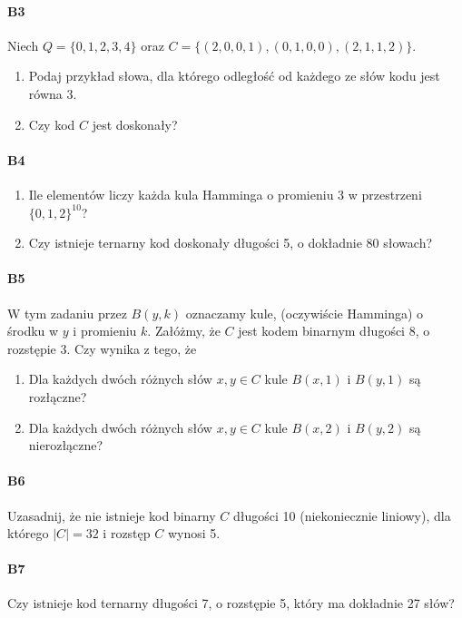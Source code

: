 \documentclass[a4paper,12pt]{article}
\theoremstyle{definition}%
\theoremstyle{definition}
\theoremstyle{problem}
\begin{document}
\paragraph{B3} Niech $Q = \{0, 1, 2, 3, 4\}$ oraz $C = \{(2, 0, 0, 1),(0, 1, 0, 0),(2, 1, 1, 2)\}$.
\begin{enumerate}[label=\alph*)]
\item Podaj przykład słowa, dla którego odległość od każdego ze słów kodu jest równa 3.
\item Czy kod $C$ jest doskonały?
\end{enumerate}


\paragraph{B4}
\begin{enumerate}[label=\alph*)]
\item Ile elementów liczy każda kula Hamminga o promieniu 3 w przestrzeni $\{0, 1, 2\}^{10}$?
\item Czy istnieje ternarny kod doskonały długości 5, o dokładnie 80 słowach?
\end{enumerate}

\paragraph{B5} W tym zadaniu przez $B(y, k)$ oznaczamy kule, (oczywiście Hamminga) o środku w $y$ i promieniu $k$. Załóżmy, że $C$ jest kodem binarnym długości 8, o rozstępie 3. Czy wynika z tego, że
\begin{enumerate}[label=\alph*)]
\item Dla każdych dwóch różnych słów $x, y \in C$ kule $B(x, 1)$ i $B(y, 1)$ są rozłączne?
\item Dla każdych dwóch różnych słów $x, y \in C$ kule $B(x, 2)$ i $B(y, 2)$ są nierozłączne?
\end{enumerate}

\paragraph{B6} Uzasadnij, że nie istnieje kod binarny $C$ długości 10 (niekoniecznie liniowy), dla którego $|C| = 32$ i rozstęp $C$ wynosi 5.

\paragraph{B7} Czy istnieje kod ternarny długości 7, o rozstępie 5, który ma dokładnie 27 słów?
\end{document}
